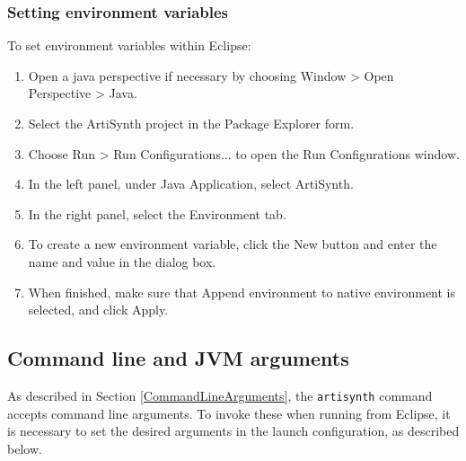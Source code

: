 \subsubsection {Setting environment variables}
\label{SettingEnvironmentVariables}

To set environment variables within Eclipse:

\begin{enumerate}

\item Open a java perspective if necessary by choosing
  {\sf Window > Open Perspective > Java}.

\item Select the ArtiSynth project in the {\sf Package Explorer} form.

\item Choose {\sf Run > Run Configurations...} to open the {\sf Run
  Configurations} window.

\item In the left panel, under {\sf Java Application}, select {\sf ArtiSynth}.

\item In the right panel, select the {\sf Environment} tab.

\item To create a new environment variable, click the {\sf New} button and
  enter the name and value in the dialog box. 

\item When finished, make sure that {\sf Append environment to native
  environment} is selected, and click {\sf Apply}.

\end{enumerate}


\subsection{Command line and JVM arguments}
\label{EclipseCommandArguments}

As described in Section \ref{CommandLineArguments}, the {\tt artisynth}
command accepts command line arguments. To invoke these when
running from Eclipse, it is necessary to set the desired arguments in
the launch configuration, as described below. 

